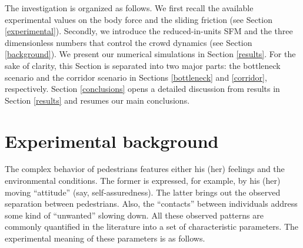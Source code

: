 \documentclass[preprint,12pt]{elsarticle}
\begin{document}
The investigation is organized as follows. We first recall the available 
experimental values on the body force and the sliding friction (see Section 
\ref{experimental}). Secondly, we introduce the reduced-in-units SFM and the 
three dimensionless numbers that control the crowd dynamics (see Section 
\ref{background}). We present our numerical simulations in Section 
\ref{results}. For the sake of clarity, this Section is 
separated into two major parts: the bottleneck scenario and the corridor 
scenario in Sections \ref{bottleneck} and \ref{corridor}, respectively. 
Section \ref{conclusions} opens a detailed discussion from results in Section \ref{results}
and resumes our main conclusions.

\section{\label{experimental}Experimental background}

The complex behavior of pedestrians features
 either his (her) feelings and 
the environmental conditions. The former is expressed, for example, by his 
(her) moving ``attitude'' (say, self-assuredness). The latter brings out the 
observed separation between pedestrians. Also, the ``contacts'' between 
individuals address some kind of ``unwanted'' slowing down. All these 
observed patterns are commonly quantified in the literature into a set of 
characteristic  parameters. The experimental meaning of these parameters is as 
follows.
\end{document}

